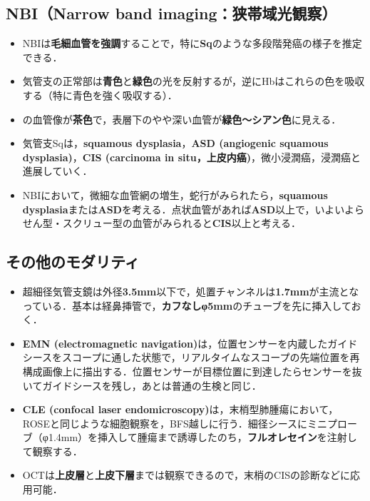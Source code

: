 \subsection{NBI（Narrow band imaging：狭帯域光観察）}
\begin{itemize}
\item NBIは\textbf{毛細血管を強調}することで，特に\textbf{Sq}のような多段階発癌の様子を推定できる．
\item 気管支の正常部は\textbf{青色}と\textbf{緑色}の光を反射するが，逆にHbはこれらの色を吸収する（特に青色を強く吸収する）．
\item {}の血管像が\textbf{茶色}で，表層下のやや深い血管が\textbf{緑色〜シアン色}に見える．
\item 気管支Sqは，\textbf{squamous dysplasia}，\textbf{ASD (angiogenic squamous dysplasia)}，\textbf{CIS (carcinoma in situ，上皮内癌)}，微小浸潤癌，浸潤癌と進展していく．
\item NBIにおいて，微細な血管網の増生，蛇行がみられたら，\textbf{squamous dysplasia}または\textbf{ASD}を考える．点状血管があれば\textbf{ASD}以上で，いよいよらせん型・スクリュー型の血管がみられると\textbf{CIS}以上と考える．



\end{itemize}

\subsection{その他のモダリティ}

\begin{itemize}

\item 超細径気管支鏡は外径\textbf{3.5mm}以下で，処置チャンネルは\textbf{1.7mm}が主流となっている．基本は経鼻挿管で，\textbf{カフなしφ5mm}のチューブを先に挿入しておく．

\item \textbf{EMN (electromagnetic navigation)}は，位置センサーを内蔵したガイドシースをスコープに通した状態で，リアルタイムなスコープの先端位置を再構成画像上に描出する．位置センサーが目標位置に到達したらセンサーを抜いてガイドシースを残し，あとは普通の生検と同じ．
\item \textbf{CLE (confocal laser endomicroscopy)}は，末梢型肺腫瘍において，ROSEと同じような細胞観察を，BFS越しに行う．細径シースにミニプローブ（φ1.4mm）を挿入して腫瘍まで誘導したのち，\textbf{フルオレセイン}を注射して観察する．
\item OCTは\textbf{上皮層}と\textbf{上皮下層}までは観察できるので，末梢のCISの診断などに応用可能．
\end{itemize}

